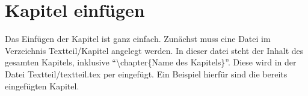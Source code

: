 
\chapter{Kapitel einfügen}

Das Einfügen der Kapitel ist ganz einfach. 
Zunächst muss eine Datei im Verzeichnis Textteil/Kapitel angelegt werden. 
In dieser datei steht der Inhalt des gesamten Kapitels, inklusive \enquote{\textbackslash chapter\{Name des Kapitels\}}. 
Diese wird in der Datei Textteil/textteil.tex per \verb|| eingefügt. 
Ein Beispiel hierfür sind die bereits eingefügten Kapitel.